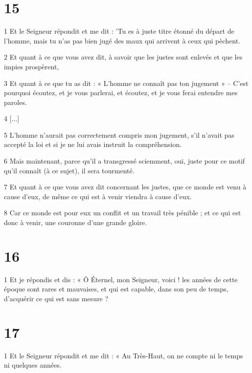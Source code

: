\chapter{15}

\par 1 Et le Seigneur répondit et me dit : 'Tu es à juste titre étonné du départ de l'homme, mais tu n'as pas bien jugé des maux qui arrivent à ceux qui pèchent.

\par 2 Et quant à ce que vous avez dit, à savoir que les justes sont enlevés et que les impies prospèrent,

\par 3 Et quant à ce que tu as dit : « L’homme ne connaît pas ton jugement » – C’est pourquoi écoutez, et je vous parlerai, et écoutez, et je vous ferai entendre mes paroles.

\par 4 [...]

\par 5 L'homme n'aurait pas correctement compris mon jugement, s'il n'avait pas accepté la loi et si je ne lui avais instruit la compréhension.

\par 6 Mais maintenant, parce qu'il a transgressé sciemment, oui, juste pour ce motif qu'il connaît (à ce sujet), il sera tourmenté.

\par 7 Et quant à ce que vous avez dit concernant les justes, que ce monde est venu à cause d'eux, de même ce qui est à venir viendra à cause d'eux.

\par 8 Car ce monde est pour eux un conflit et un travail très pénible ; et ce qui est donc à venir, une couronne d'une grande gloire.

\chapter{16}

\par 1 Et je répondis et dis : « Ô Éternel, mon Seigneur, voici ! les années de cette époque sont rares et mauvaises, et qui est capable, dans son peu de temps, d'acquérir ce qui est sans mesure ?

\chapter{17}

\par 1 Et le Seigneur répondit et me dit : « Au Très-Haut, on ne compte ni le temps ni quelques années.

